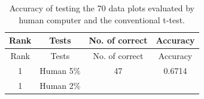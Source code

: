 \documentclass[12pt]{article}
\begin{document}
\begin{longtable}[]{@{}cccc@{}}
\caption{Accuracy of testing the 70 data plots evaluated by human
computer and the conventional t-test.}\tabularnewline
\toprule
\begin{minipage}[b]{0.09\columnwidth}\centering\strut
Rank\strut
\end{minipage} & \begin{minipage}[b]{0.17\columnwidth}\centering\strut
Tests\strut
\end{minipage} & \begin{minipage}[b]{0.21\columnwidth}\centering\strut
No. of correct\strut
\end{minipage} & \begin{minipage}[b]{0.12\columnwidth}\centering\strut
Accuracy\strut
\end{minipage}\tabularnewline
\midrule
\endfirsthead
\toprule
\begin{minipage}[b]{0.09\columnwidth}\centering\strut
Rank\strut
\end{minipage} & \begin{minipage}[b]{0.17\columnwidth}\centering\strut
Tests\strut
\end{minipage} & \begin{minipage}[b]{0.21\columnwidth}\centering\strut
No. of correct\strut
\end{minipage} & \begin{minipage}[b]{0.12\columnwidth}\centering\strut
Accuracy\strut
\end{minipage}\tabularnewline
\midrule
\endhead
\begin{minipage}[t]{0.09\columnwidth}\centering\strut
1\strut
\end{minipage} & \begin{minipage}[t]{0.17\columnwidth}\centering\strut
Human 5\%\strut
\end{minipage} & \begin{minipage}[t]{0.21\columnwidth}\centering\strut
47\strut
\end{minipage} & \begin{minipage}[t]{0.12\columnwidth}\centering\strut
0.6714\strut
\end{minipage}\tabularnewline
\begin{minipage}[t]{0.09\columnwidth}\centering\strut
1\strut
\end{minipage} & \begin{minipage}[t]{0.17\columnwidth}\centering\strut
Human 2\%\strut
\end{minipage} & \begin{minipage}[t]{0.21\columnwidth}\centering\strut

\end{minipage}
\end{longtable}
\end{document}
